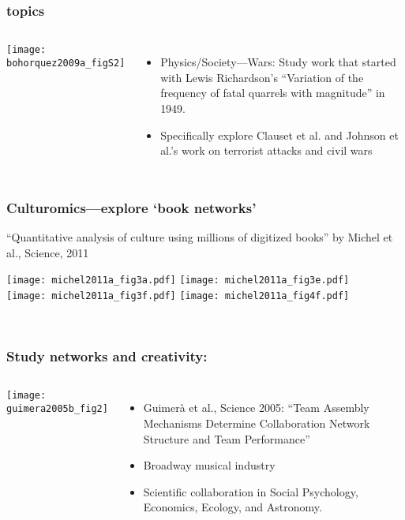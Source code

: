 \begin{frame}
  \frametitle{topics}

  \begin{columns}
    \texttt{[image: bohorquez2009a\_figS2]}
    \begin{itemize}
    \item<1->
      Physics/Society---\alert{Wars:} Study work that
      started with Lewis Richardson's ``Variation of the frequency of
      fatal quarrels with magnitude'' in 1949.
    \item<2->
      Specifically explore Clauset et al. 
      and Johnson et al.'s work\cite{clauset2007b,johnson2006a,bohorquez2009a}
      on terrorist attacks and civil wars
    \end{itemize}
  \end{columns}

\end{frame}

\begin{frame}
  \frametitle{Culturomics---explore `book networks'}

  \small{``Quantitative analysis of culture using millions of
    digitized books'' by Michel et al., Science, 2011\cite{michel2011a}}

  \texttt{[image: michel2011a\_fig3a.pdf]} 
  \texttt{[image: michel2011a\_fig3e.pdf]} \\
  \texttt{[image: michel2011a\_fig3f.pdf]}
  \texttt{[image: michel2011a\_fig4f.pdf]}

  {\small
    \\
  }

\end{frame}

\begin{frame}
  \frametitle{Study networks and creativity:}

  \begin{columns}
    \texttt{[image: guimera2005b\_fig2]}
    \begin{itemize}
    \item
      Guimer\`{a} et al., Science 2005:\cite{guimera2005b}
      ``Team Assembly Mechanisms Determine Collaboration Network Structure and Team Performance''
    \item 
      Broadway musical industry
    \item 
      Scientific collaboration in Social Psychology, Economics, Ecology, and Astronomy.
    \end{itemize}
  \end{columns}

\end{frame}

